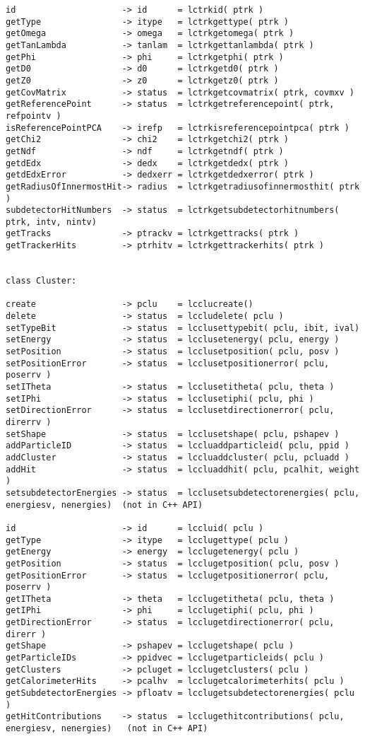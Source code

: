 \begin{scriptsize}
\begin{verbatim}
id                     -> id      = lctrkid( ptrk )
getType                -> itype   = lctrkgettype( ptrk )
getOmega               -> omega   = lctrkgetomega( ptrk )
getTanLambda           -> tanlam  = lctrkgettanlambda( ptrk )
getPhi                 -> phi     = lctrkgetphi( ptrk )
getD0                  -> d0      = lctrkgetd0( ptrk )
getZ0                  -> z0      = lctrkgetz0( ptrk )
getCovMatrix           -> status  = lctrkgetcovmatrix( ptrk, covmxv )
getReferencePoint      -> status  = lctrkgetreferencepoint( ptrk, refpointv )
isReferencePointPCA    -> irefp   = lctrkisreferencepointpca( ptrk )
getChi2                -> chi2    = lctrkgetchi2( ptrk )
getNdf                 -> ndf     = lctrkgetndf( ptrk )
getdEdx                -> dedx    = lctrkgetdedx( ptrk )
getdEdxError           -> dedxerr = lctrkgetdedxerror( ptrk )
getRadiusOfInnermostHit-> radius  = lctrkgetradiusofinnermosthit( ptrk )
subdetectorHitNumbers  -> status  = lctrkgetsubdetectorhitnumbers( ptrk, intv, nintv)
getTracks              -> ptrackv = lctrkgettracks( ptrk )
getTrackerHits         -> ptrhitv = lctrkgettrackerhits( ptrk )


class Cluster:

create                 -> pclu    = lcclucreate()
delete                 -> status  = lccludelete( pclu )
setTypeBit             -> status  = lcclusettypebit( pclu, ibit, ival)
setEnergy              -> status  = lcclusetenergy( pclu, energy )
setPosition            -> status  = lcclusetposition( pclu, posv )
setPositionError       -> status  = lcclusetpositionerror( pclu, poserrv )
setITheta              -> status  = lcclusetitheta( pclu, theta )
setIPhi                -> status  = lcclusetiphi( pclu, phi )
setDirectionError      -> status  = lcclusetdirectionerror( pclu, direrrv )
setShape               -> status  = lcclusetshape( pclu, pshapev )
addParticleID          -> status  = lccluaddparticleid( pclu, ppid )
addCluster             -> status  = lccluaddcluster( pclu, pcluadd )
addHit                 -> status  = lccluaddhit( pclu, pcalhit, weight )
setsubdetectorEnergies -> status  = lcclusetsubdetectorenergies( pclu, energiesv, nenergies)  (not in C++ API)

id                     -> id      = lccluid( pclu )
getType                -> itype   = lcclugettype( pclu )
getEnergy              -> energy  = lcclugetenergy( pclu )
getPosition            -> status  = lcclugetposition( pclu, posv )
getPositionError       -> status  = lcclugetpositionerror( pclu, poserrv )
getITheta              -> theta   = lcclugetitheta( pclu, theta )
getIPhi                -> phi     = lcclugetiphi( pclu, phi )
getDirectionError      -> status  = lcclugetdirectionerror( pclu, direrr )
getShape               -> pshapev = lcclugetshape( pclu )
getParticleIDs         -> ppidvec = lcclugetparticleids( pclu )
getClusters            -> pcluget = lcclugetclusters( pclu )
getCalorimeterHits     -> pcalhv  = lcclugetcalorimeterhits( pclu )
getSubdetectorEnergies -> pfloatv = lcclugetsubdetectorenergies( pclu )
getHitContributions    -> status  = lcclugethitcontributions( pclu, energiesv, nenergies)   (not in C++ API)




\end{verbatim}
\end{scriptsize}
